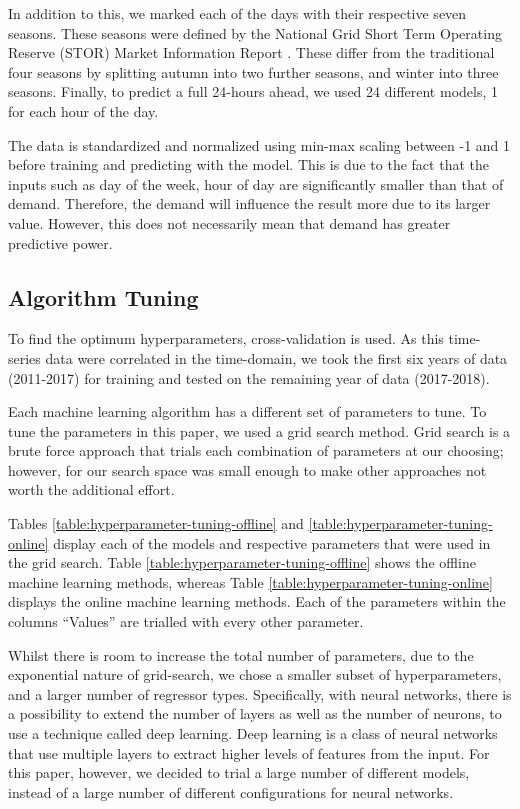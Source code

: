 In addition to this, we marked each of the days with their respective seven seasons. These seasons were defined by the National Grid Short Term Operating Reserve (STOR) Market Information Report \cite{ESO2019}. These differ from the traditional four seasons by splitting autumn into two further seasons, and winter into three seasons. Finally, to predict a full 24-hours ahead, we used 24 different models, 1 for each hour of the day. 


The data is standardized and normalized using min-max scaling between -1 and 1 before training and predicting with the model. This is due to the fact that the inputs such as day of the week, hour of day are significantly smaller than that of demand. Therefore, the demand will influence the result more due to its larger value. However, this does not necessarily mean that demand has greater predictive power.

\subsection{Algorithm Tuning}

To find the optimum hyperparameters, cross-validation is used. As this time-series data were correlated in the time-domain, we took the first six years of data (2011-2017) for training and tested on the remaining year of data (2017-2018).

Each machine learning algorithm has a different set of parameters to tune. To tune the parameters in this paper, we used a grid search method. Grid search is a brute force approach that trials each combination of parameters at our choosing; however, for our search space was small enough to make other approaches not worth the additional effort.

Tables \ref{table:hyperparameter-tuning-offline} and \ref{table:hyperparameter-tuning-online} display each of the models and respective parameters that were used in the grid search. Table \ref{table:hyperparameter-tuning-offline} shows the offline machine learning methods, whereas Table \ref{table:hyperparameter-tuning-online} displays the online machine learning methods. Each of the parameters within the columns ``Values'' are trialled with every other parameter.

Whilst there is room to increase the total number of parameters, due to the exponential nature of grid-search, we chose a smaller subset of hyperparameters, and a larger number of regressor types. Specifically, with neural networks, there is a possibility to extend the number of layers as well as the number of neurons, to use a technique called deep learning. Deep learning is a class of neural networks that use multiple layers to extract higher levels of features from the input. For this paper, however, we decided to trial a large number of different models, instead of a large number of different configurations for neural networks.



